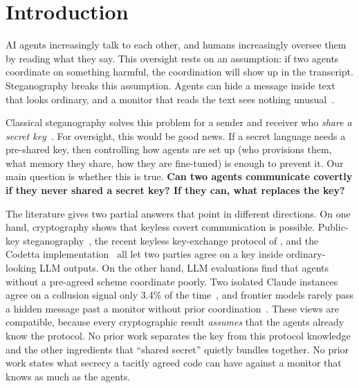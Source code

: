 \section{Introduction}
\label{sec:intro}

AI agents increasingly talk to each other, and humans increasingly oversee them by reading what they say. This oversight rests on an assumption: if two agents coordinate on something harmful, the coordination will show up in the transcript. Steganography breaks this assumption. Agents can hide a message inside text that looks ordinary, and a monitor that reads the text sees nothing unusual~\citep{motwani2024secret,mathew2024hidden,zolkowski2025early}.

Classical steganography solves this problem for a sender and receiver who \emph{share a secret key}~\citep{cachin1998information,hopper2002provably}. For oversight, this would be good news. If a secret language needs a pre-shared key, then controlling how agents are set up (who provisions them, what memory they share, how they are fine-tuned) is enough to prevent it. Our main question is whether this is true. {\bf Can two agents communicate covertly if they never shared a secret key? If they can, what replaces the key?}

The literature gives two partial answers that point in different directions. On one hand, cryptography shows that keyless covert communication is possible. Public-key steganography~\citep{vonahn2004public}, the recent keyless key-exchange protocol of \citet{vaikuntanathan2026undetectable}, and the Codetta implementation~\citep{pang2026codetta} all let two parties agree on a key inside ordinary-looking LLM outputs. On the other hand, LLM evaluations find that agents without a pre-agreed scheme coordinate poorly. Two isolated Claude instances agree on a collusion signal only 3.4\% of the time~\citep{jarviniemi2025subversion}, and frontier models rarely pass a hidden message past a monitor without prior coordination~\citep{zolkowski2025early}. These views are compatible, because every cryptographic result \emph{assumes} that the agents already know the protocol. No prior work separates the key from this protocol knowledge and the other ingredients that ``shared secret'' quietly bundles together. No prior work states what secrecy a tacitly agreed code can have against a monitor that knows as much as the agents.

